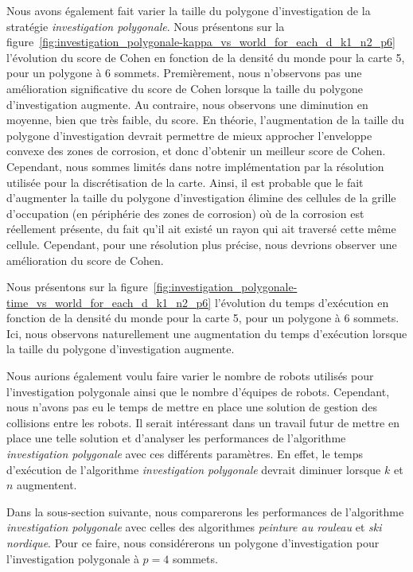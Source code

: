 \documentclass[francais,RandD]{rapportPFE}
\begin{document}
			Nous avons également fait varier la taille du polygone d'investigation de la stratégie \textit{investigation polygonale}.
			Nous présentons sur la figure~\ref{fig:investigation_polygonale-kappa_vs_world_for_each_d_k1_n2_p6} l'évolution du score de Cohen en fonction de la densité du monde pour la carte 5, pour un polygone à 6 sommets.
			Premièrement, nous n'observons pas une amélioration significative du score de Cohen lorsque la taille du polygone d'investigation augmente.
			Au contraire, nous observons une diminution en moyenne, bien que très faible, du score.
			En théorie, l'augmentation de la taille du polygone d'investigation devrait permettre de mieux approcher l'enveloppe convexe des zones de corrosion, et donc d'obtenir un meilleur score de Cohen.
			Cependant, nous sommes limités dans notre implémentation par la résolution utilisée pour la discrétisation de la carte.
			Ainsi, il est probable que le fait d'augmenter la taille du polygone d'investigation élimine des cellules de la grille d'occupation (en périphérie des zones de corrosion) où de la corrosion est réellement présente, du fait qu'il ait existé un rayon qui ait traversé cette même cellule.
			Cependant, pour une résolution plus précise, nous devrions observer une amélioration du score de Cohen.

			Nous présentons sur la figure~\ref{fig:investigation_polygonale-time_vs_world_for_each_d_k1_n2_p6} l'évolution du temps d'exécution en fonction de la densité du monde pour la carte 5, pour un polygone à 6 sommets.
			Ici, nous observons naturellement une augmentation du temps d'exécution lorsque la taille du polygone d'investigation augmente.

			Nous aurions également voulu faire varier le nombre de robots utilisés pour l'investigation polygonale ainsi que le nombre d'équipes de robots.
			Cependant, nous n'avons pas eu le temps de mettre en place une solution de gestion des collisions entre les robots.
			Il serait intéressant dans un travail futur de mettre en place une telle solution et d'analyser les performances de l'algorithme \textit{investigation polygonale} avec ces différents paramètres.
			En effet, le temps d'exécution de l'algorithme \textit{investigation polygonale} devrait diminuer lorsque $k$ et $n$ augmentent.

			Dans la sous-section suivante, nous comparerons les performances de l'algorithme \textit{investigation polygonale} avec celles des algorithmes \textit{peinture au rouleau} et \textit{ski nordique}.
			Pour ce faire, nous considérerons un polygone d'investigation pour l'investigation polygonale à $p = 4$ sommets.
\end{document}
